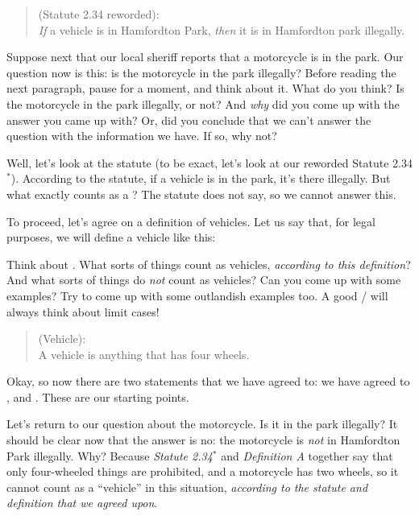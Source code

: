 \documentclass[../../../main.tex]{subfiles}
\begin{document}
\begin{quote}
   (Statute 2.34 reworded): \\
  \emph{If} a vehicle is in Hamfordton Park, \emph{then} it is in Hamfordton park illegally.
\end{quote}

\noindent
Suppose next that our local sheriff reports that a motorcycle is in the park. Our question now is this: is the motorcycle in the park illegally? Before reading the next paragraph, pause for a moment, and think about it. What do you think? Is the motorcycle in the park illegally, or not? And \emph{why} did you come up with the answer you came up with? Or, did you conclude that we can't answer the question with the information we have. If so, why not?

Well, let's look at the statute (to be exact, let's look at our reworded Statute 2.34$^{*}$). According to the statute, if a vehicle is in the park, it's there illegally. But what exactly counts as a ? The statute does not say, so we cannot answer this.

To proceed, let's agree on a definition of vehicles. Let us say that, for legal purposes, we will define a vehicle like this:

\begin{aside}
  \begin{remark}
    Think about . What sorts of things count as vehicles, \emph{according to this definition}? And what sorts of things do \emph{not} count as vehicles? Can you come up with some examples? Try to come up with some outlandish examples too. A good \mather/ will always think about limit cases!
  \end{remark}
\end{aside}

\begin{quote}
     (Vehicle): \\
  A vehicle is anything that has four wheels.
\end{quote}

\noindent
Okay, so now there are two statements that we have agreed to: we have agreed to , and . These are our starting points.

Let's return to our question about the motorcycle. Is it in the park illegally? It should be clear now that the answer is no: the motorcycle is \emph{not} in Hamfordton Park illegally. Why? Because \emph{Statute 2.34$^{*}$} and \emph{Definition A} together say that only four-wheeled things are prohibited, and a motorcycle has two wheels, so it cannot count as a ``vehicle'' in this situation, \emph{according to the statute and definition that we agreed upon}.
\end{document}
